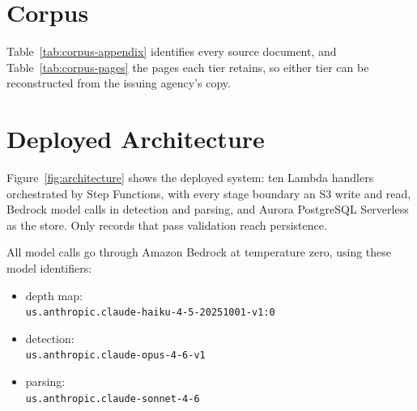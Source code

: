 \documentclass[11pt]{article}
\begin{document}
\section{Corpus}
\label{sec:appendix-corpus}

Table~\ref{tab:corpus-appendix} identifies every source document, and
Table~\ref{tab:corpus-pages} the pages each tier retains, so either tier can be
reconstructed from the issuing agency's copy.




\section{Deployed Architecture}
\label{sec:appendix-architecture}



Figure~\ref{fig:architecture} shows the deployed system: ten Lambda handlers
orchestrated by Step Functions, with every stage boundary an S3 write and read,
Bedrock model calls in detection and parsing, and Aurora PostgreSQL Serverless
as the store. Only records that pass validation reach persistence.

All model calls go through Amazon Bedrock at temperature zero, using these
model identifiers:

{\small
  \begin{itemize}
      \setlength{\itemsep}{0pt}
    \item depth map:\\ \texttt{us.anthropic.claude-haiku-4-5-20251001-v1:0}
    \item detection:\\ \texttt{us.anthropic.claude-opus-4-6-v1}
    \item parsing:\\ \texttt{us.anthropic.claude-sonnet-4-6}
\end{itemize}}
\end{document}
